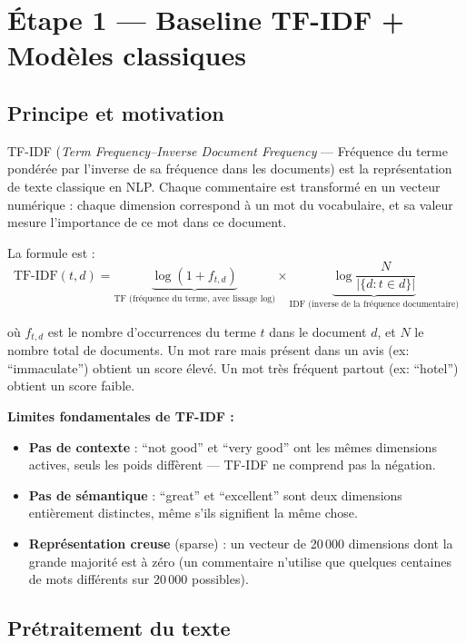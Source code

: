 \documentclass[12pt, a4paper]{article}
\begin{document}
\section{Étape 1 — Baseline TF-IDF + Modèles classiques}
\label{sec:tfidf}

\subsection{Principe et motivation}

TF-IDF (\textit{Term Frequency–Inverse Document Frequency} — Fréquence du terme pondérée
par l'inverse de sa fréquence dans les documents) est la représentation de texte classique
en NLP. Chaque commentaire est transformé en un vecteur numérique : chaque dimension
correspond à un mot du vocabulaire, et sa valeur mesure l'importance de ce mot dans ce document.

La formule est :
\begin{equation}
  \text{TF-IDF}(t, d) =
  \underbrace{\log(1 + f_{t,d})}_{\text{TF (fréquence du terme, avec lissage log)}}
  \times
  \underbrace{\log\frac{N}{|\{d : t \in d\}|}}_{\text{IDF (inverse de la fréquence documentaire)}}
\end{equation}

où $f_{t,d}$ est le nombre d'occurrences du terme $t$ dans le document $d$, et $N$ le nombre
total de documents. Un mot rare mais présent dans un avis (ex: ``immaculate'') obtient un score
élevé. Un mot très fréquent partout (ex: ``hotel'') obtient un score faible.

\textbf{Limites fondamentales de TF-IDF :}
\begin{itemize}
  \item \textbf{Pas de contexte} : ``not good'' et ``very good'' ont les mêmes dimensions
        actives, seuls les poids diffèrent — TF-IDF ne comprend pas la négation.
  \item \textbf{Pas de sémantique} : ``great'' et ``excellent'' sont deux dimensions
        entièrement distinctes, même s'ils signifient la même chose.
  \item \textbf{Représentation creuse} (sparse) : un vecteur de 20\,000 dimensions
        dont la grande majorité est à zéro (un commentaire n'utilise que quelques centaines
        de mots différents sur 20\,000 possibles).
\end{itemize}

\subsection{Prétraitement du texte}
\end{document}
